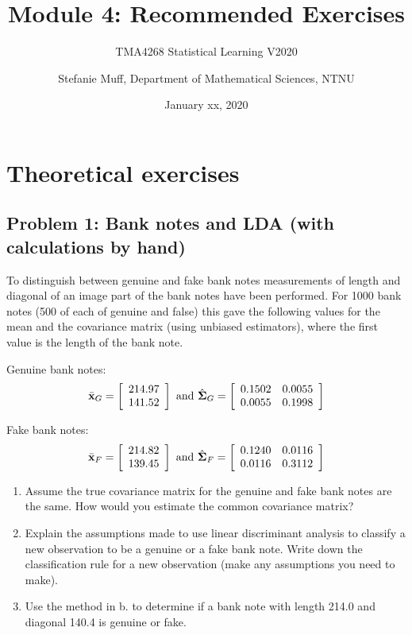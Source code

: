 \documentclass[]{article}
\title{Module 4: Recommended Exercises}
\subtitle{TMA4268 Statistical Learning V2020}
\author{Stefanie Muff, Department of Mathematical Sciences, NTNU}
\date{January xx, 2020}
\begin{document}
\maketitle

{
\hypersetup{linkcolor=black}
\setcounter{tocdepth}{2}
\tableofcontents
}
\section{Theoretical exercises}\label{theoretical-exercises}

\subsection{Problem 1: Bank notes and LDA (with calculations by
hand)}\label{problem-1-bank-notes-and-lda-with-calculations-by-hand}

To distinguish between genuine and fake bank notes measurements of
length and diagonal of an image part of the bank notes have been
performed. For 1000 bank notes (500 of each of genuine and false) this
gave the following values for the mean and the covariance matrix (using
unbiased estimators), where the first value is the length of the bank
note.

Genuine bank notes: \[
   \bar{\bf x}_G=\left[     \begin{array}{c} 214.97 \\ 141.52  \end{array} \right]
\text{ and }
   \hat{\boldsymbol \Sigma}_G=\left[     \begin{array}{cc} 0.1502 & 0.0055 \\ 0.0055 & 0.1998 
\end{array} \right]
\]

Fake bank notes: \[
   \bar{\bf x}_F= \left[     \begin{array}{c} 214.82 \\ 139.45  \end{array} \right]
\text{ and }
   \hat{\boldsymbol \Sigma}_F= \left[     \begin{array}{cc} 0.1240 & 0.0116 \\ 0.0116 & 0.3112 
\end{array} \right]
\]

\begin{enumerate}
\def\labelenumi{\alph{enumi}.}
\item
  Assume the true covariance matrix for the genuine and fake bank notes
  are the same. How would you estimate the common covariance matrix?
\item
  Explain the assumptions made to use linear discriminant analysis to
  classify a new observation to be a genuine or a fake bank note. Write
  down the classification rule for a new observation (make any
  assumptions you need to make).
\item
  Use the method in b. to determine if a bank note with length 214.0 and
  diagonal 140.4 is genuine or fake.
\end{enumerate}
\end{document}
